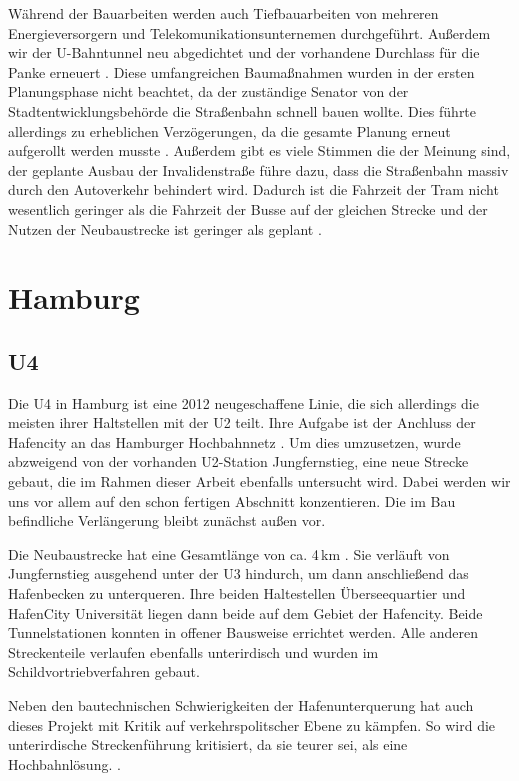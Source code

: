 Während der Bauarbeiten werden auch Tiefbauarbeiten von mehreren
Energieversorgern und Telekomunikationsunternemen
durchgeführt. Außerdem wir der U-Bahntunnel neu abgedichtet und
der vorhandene Durchlass für die Panke
erneuert \cite{flyerInvalidestr}. Diese umfangreichen Baumaßnahmen
wurden in der ersten Planungsphase nicht beachtet, da der zuständige
Senator von der Stadtentwicklungsbehörde die Straßenbahn schnell bauen
wollte. Dies führte allerdings zu erheblichen Verzögerungen, da die
gesamte Planung erneut aufgerollt werden
musste \cite{bzSchnell}. Außerdem gibt es viele Stimmen die der Meinung
sind, der geplante Ausbau der Invalidenstraße führe dazu, dass die
Straßenbahn massiv durch den Autoverkehr behindert wird. Dadurch ist
die Fahrzeit der Tram nicht wesentlich geringer als die Fahrzeit der
Busse auf der gleichen Strecke und der Nutzen der Neubaustrecke ist
geringer als geplant \cite{protram}.

\section{Hamburg}
\subsection*{U4}

Die U4 in Hamburg ist eine 2012 neugeschaffene Linie, die sich allerdings die
meisten ihrer Haltstellen mit der U2 teilt. Ihre Aufgabe ist der Anchluss der
Hafencity an das Hamburger Hochbahnnetz \cite{keuHH}. Um dies umzusetzen, wurde
abzweigend von der vorhanden U2-Station Jungfernstieg, eine neue Strecke gebaut,
die im Rahmen dieser Arbeit ebenfalls untersucht wird. Dabei werden wir uns vor
allem auf den schon fertigen Abschnitt konzentieren. Die im Bau befindliche
Verlängerung bleibt zunächst außen vor.

Die Neubaustrecke hat eine Gesamtlänge von ca. 4\,km \cite{keuHH}. Sie verläuft
von Jungfernstieg ausgehend unter der U3 hindurch, um dann anschließend das
Hafenbecken zu unterqueren. Ihre beiden Haltestellen Überseequartier und
HafenCity Universität liegen dann beide auf dem Gebiet der Hafencity. Beide
Tunnelstationen konnten in offener Bausweise errichtet werden. Alle anderen
Streckenteile verlaufen ebenfalls unterirdisch und wurden im
Schildvortriebverfahren gebaut.

Neben den bautechnischen Schwierigkeiten der Hafenunterquerung hat auch dieses
Projekt mit Kritik auf verkehrspolitscher Ebene zu kämpfen. So wird die
unterirdische Streckenführung kritisiert, da sie teurer sei, als eine
Hochbahnlösung. \cite{hamburgerAbendblattu4}.

